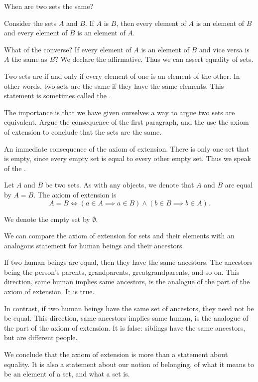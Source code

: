 
\sbasic




\sstart
{}


When are two
sets the same?


Consider the sets
$A$ and $B$.
If $A$ is $B$,
then every element of
$A$ is an element of
$B$ and every element
of $B$ is an element of
$A$.

What of the converse?
If every element of $A$
is an element of $B$
and vice versa is $A$
the same as $B$?
We declare the affirmative.
Thus we can assert equality
of sets.

Two sets are
if and only
if every element of one
is an element of the other.
In other words, two sets are
the same if they have the same
elements.
This statement
is sometimes called the
.

The importance is that we have
given ourselves a way to argue
two sets are equivalent. Argue
the consequence of the first
paragraph, and the use the
axiom of extension to conclude
that the sets are the same.

An immediate consequence of the axiom
of extension.
There is only one set that
is empty,
since every empty set
is equal to
every other empty set.
Thus we speak of
the .


Let $A$ and $B$ be
two sets.
As with any objects,
we denote that
$A$ and $B$
are equal
by $A = B$.
The axiom of extension is
\[
  A = B \Leftrightarrow (a \in A \implies a \in B) \land (b \in B \implies b \in A).
\]

We denote the empty set
by $\emptyset$.


We can compare the axiom of extension
for sets and their elements with an
analogous statement
for human beings and their ancestors.

If two human beings are equal,
then they have the same ancestors.
The ancestors being the person's parents,
grandparents, greatgrandparents,
and so on.
This direction, same human implies
same ancestors, is the analogue of
the  part of the axiom
of extension.
It is true.

In contrast, if two human beings have
the same set of ancestors, they need not be
be equal.
This direction, same ancestors implies
same human, is the analogue of the
 part of the axiom
of extension.
It is false:
siblings have the same ancestors,
but are different people.

We conclude that the axiom of extension
is more than a statement about equality.
It is also a statement about our notion of
belonging, of what it means
to be an element of a set, and what a set is.
\strats
